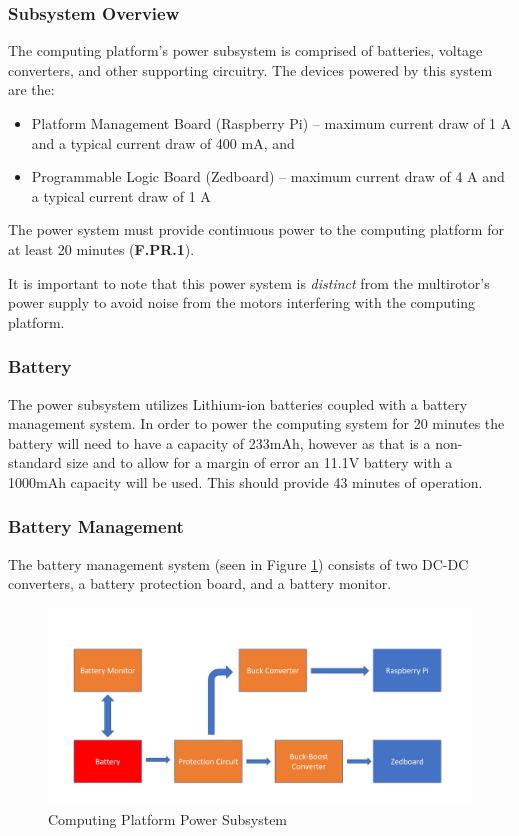 \subsubsection{Subsystem Overview}
The computing platform's power subsystem is comprised of batteries, voltage converters, and other supporting circuitry. The devices powered by this system are the:

\begin{itemize}
\item Platform Management Board (Raspberry Pi) -- maximum current draw of 1 A and a typical current draw of 400 mA, and
\item Programmable Logic Board (Zedboard) -- maximum current draw of 4 A and a typical current draw of 1 A
\end{itemize}

The power system must provide continuous power to the computing platform for at least 20 minutes (\textbf{F.PR.1}).

It is important to note that this power system is \textit{distinct} from the multirotor's power supply to avoid noise from the motors interfering with the computing platform. 

\subsubsection{Battery}
The power subsystem utilizes Lithium-ion batteries coupled with a battery management system. In order to
power the computing system for 20 minutes the battery will need to have a capacity of 233mAh, however as that is a non-standard size and to allow for a margin of error an 11.1V battery with a 1000mAh capacity will be used. This should provide 43 minutes of operation.

\subsubsection{Battery Management}
 
The battery management system (seen in Figure \ref{powerdiag}) consists of two DC-DC converters, a battery protection board, and a battery monitor. 

\begin{figure}[H]
\centering
\includegraphics[width=15cm]{img/Power_Diagram.png}
\caption{Computing Platform Power Subsystem}
\label{powerdiag}
\end{figure}

